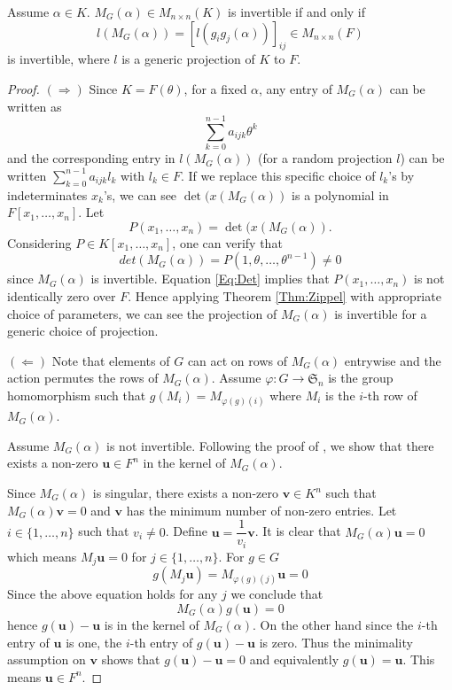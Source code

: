 \documentclass[sigconf]{acmart}
\theoremstyle{acmplain}
\begin{document}
\begin{lemma}\label{Lem:Proj}
Assume $\alpha \in K$. $M_G(\alpha) \in M_{n \times n}(K)$ 
is invertible if and only if $$l(M_G(\alpha)) =  [l(g_ig_j(\alpha))]_{ij}  \in M_{n \times n}(F)$$ is invertible,
 where $l$ is a generic projection of $K$ to $F$.
\end{lemma}

\begin{proof}
$(\Rightarrow)$ Since $K = F(\theta)$, for a fixed $\alpha$, any entry of $M_G(\alpha)$ can be written as 
\begin{equation}\label{Eq:PrimElm}
\sum_{k= 0}^{n-1} a_{ijk}\theta^k
\end{equation}
 and the corresponding entry in $l(M_G(\alpha))$ (for a random projection $l$)
 can be written $\sum_{k= 0}^{n-1} a_{ijk}l_k$ with $l_k\in F$. If we replace this specific choice of $l_k$'s by 
 indeterminates $x_k$'s, we can see $\det(x(M_G(\alpha))$ is a polynomial in $F[x_1, \ldots, x_n].$ Let 
 $$P(x_1, \ldots, x_n) = \det(x(M_G(\alpha)).$$ 
 Considering $P \in K[x_1, \ldots , x_n]$, one can verify that 
 \begin{equation}\label{Eq:Det}
 det(M_G(\alpha))= P(1, \theta, \ldots, \theta^{n-1}) \neq 0
 \end{equation}
 since $M_G(\alpha)$ is invertible. Equation \ref{Eq:Det} implies that $P(x_1, \ldots, x_n)$ is not identically zero over $F$. Hence applying Theorem \ref{Thm:Zippel} with appropriate choice of parameters, we can see 
 the projection of $M_G(\alpha)$ is invertible for a generic choice of projection. 
 
 $(\Leftarrow)$  Note that elements of $G$ can act on 
 rows of $M_G(\alpha)$ entrywise and the action permutes the rows of $M_G(\alpha)$. Assume $\varphi : G \longrightarrow \mathfrak{S}_n$ is the group homomorphism 
 such that $g(M_i) = M_{\varphi(g)(i)}$ where $M_i$ is the $i$-th row of $M_G(\alpha)$.
 
 Assume $M_G(\alpha)$ is not invertible. Following the proof of \cite[Lemma 4]{Armin}, we show that there exists a non-zero $\textbf{u} \in F^n$ in the kernel of $M_G(\alpha)$. 
 
 Since $M_G(\alpha)$ is singular, there exists a non-zero $\textbf{v} \in K^n$  such that $M_G(\alpha)\textbf{v} = 0$ and $\textbf{v}$ has the minimum number of non-zero entries. Let $i \in  \lbrace 1, \ldots , n \rbrace$ such that $v_i \neq 0$. Define $\textbf{u} = \dfrac{1}{v_i}\textbf{v}$. It is clear  that $M_G(\alpha)\textbf{u} = 0$ which means $M_j \textbf{u} = 0 $ for $j \in \lbrace 1, \ldots, n \rbrace$. For $g \in G$
 \begin{equation}
  g(M_j \textbf{u}) = M_{\varphi(g)(j)} \textbf{u}= 0
 \end{equation}
 Since the above equation holds for any $j$ we conclude that $$M_G(\alpha)g(\textbf{u})= 0$$ hence
 $g(\textbf{u})-\textbf{u}$ is in the kernel of $M_G(\alpha)$. On the other hand since the $i$-th entry 
 of $\textbf{u}$ is one, the $i$-th entry of $g(\textbf{u}) -\textbf{u}$ is zero. Thus the minimality assumption
 on $\textbf{v}$ shows that $g(\textbf{u}) -\textbf{u} = 0$ and equivalently $g(\textbf{u})=\textbf{u}$. This 
 means $\textbf{u} \in F^n$.
 

\end{proof}
\end{document}
